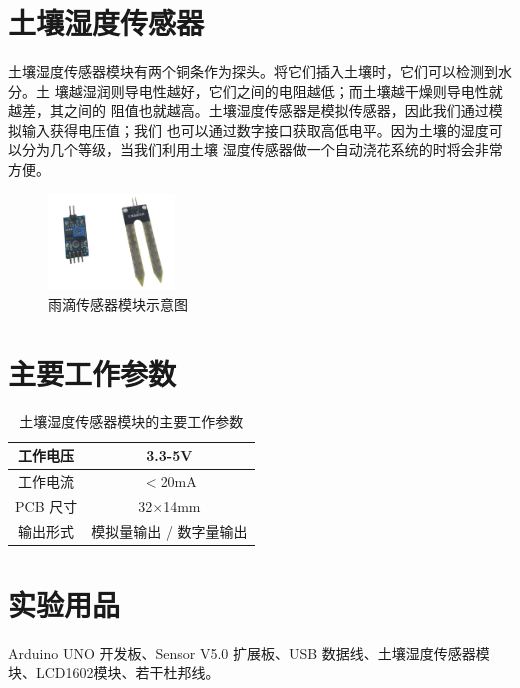 \documentclass[UTF8, oneside]{ctexbook}
\begin{document}
\section{土壤湿度传感器}
\paragraph{}
土壤湿度传感器模块有两个铜条作为探头。将它们插入土壤时，它们可以检测到水分。土
壤越湿润则导电性越好，它们之间的电阻越低；而土壤越干燥则导电性就越差，其之间的
阻值也就越高。土壤湿度传感器是模拟传感器，因此我们通过模拟输入获得电压值；我们
也可以通过数字接口获取高低电平。因为土壤的湿度可以分为几个等级，当我们利用土壤
湿度传感器做一个自动浇花系统的时将会非常方便。
\begin{figure}[h]
    \centering
    \includegraphics[width=0.3\textwidth]{./result/sensor/17/sensor.png}
    \caption{雨滴传感器模块示意图}
    \label{17_sensor}
\end{figure}

\section{主要工作参数}
\begin{table}[h]
    \centering
    \begin{tabular}{|c|c|}
    \hline
    工作电压   & 3.3-5V         \\ \hline
    工作电流 & $<$20mA \\ \hline
    PCB 尺寸 & 32$\times$14mm \\ \hline
    输出形式   & 模拟量输出 / 数字量输出  \\ \hline
    \end{tabular}
    \caption{土壤湿度传感器模块的主要工作参数}
\end{table}

\section{实验用品}
\paragraph{}
Arduino UNO 开发板、Sensor V5.0 扩展板、USB 数据线、土壤湿度传感器模块、LCD1602模块、若干杜邦线。
\end{document}
